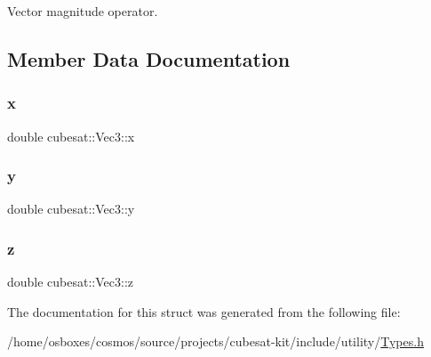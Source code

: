 Vector magnitude operator. 



\subsection{Member Data Documentation}
\mbox{\label{structcubesat_1_1Vec3_ab8dbb8bcf992eddef4692cd81d0cee59}} 
\subsubsection{\texorpdfstring{x}{x}}
{\footnotesize\ttfamily double cubesat\+::\+Vec3\+::x}

\mbox{\label{structcubesat_1_1Vec3_a1cb7ad90c1fc62bd6c111d77215191bc}} 
\subsubsection{\texorpdfstring{y}{y}}
{\footnotesize\ttfamily double cubesat\+::\+Vec3\+::y}

\mbox{\label{structcubesat_1_1Vec3_a1b86ce8ea2819a0a1a018dc31eda6265}} 
\subsubsection{\texorpdfstring{z}{z}}
{\footnotesize\ttfamily double cubesat\+::\+Vec3\+::z}



The documentation for this struct was generated from the following file\+:\begin{DoxyCompactItemize}
\item 
/home/osboxes/cosmos/source/projects/cubesat-\/kit/include/utility/\hyperlink{Types_8h}{Types.\+h}\end{DoxyCompactItemize}
